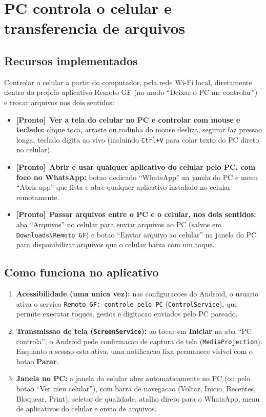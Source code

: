 \documentclass[11pt,a4paper]{article}
\newcommand{\feito}{\textcolor{laranja}{\textbf{[Pronto]}}\ }
\begin{document}
\section{PC controla o celular e transferencia de arquivos}
\label{sec:futuro}

\subsection{Recursos implementados}
Controlar o celular a partir do computador, pela rede Wi-Fi local, diretamente dentro do
proprio aplicativo Remoto GF (no modo ``Deixar o PC me controlar'') e trocar arquivos nos
dois sentidos:

\begin{itemize}
  \item \feito \textbf{Ver a tela do celular no PC e controlar com mouse e teclado:}
  clique toca, arraste ou rodinha do mouse desliza, segurar faz pressao longa, teclado
  digita ao vivo (incluindo \texttt{Ctrl+V} para colar texto do PC direto no celular).
  \item \feito \textbf{Abrir e usar qualquer aplicativo do celular pelo PC, com foco no WhatsApp:}
  botao dedicado ``WhatsApp'' na janela do PC e menu ``Abrir app'' que lista e abre
  qualquer aplicativo instalado no celular remotamente.
  \item \feito \textbf{Passar arquivos entre o PC e o celular, nos dois sentidos:}
  aba ``Arquivos'' no celular para enviar arquivos ao PC (salvos em \texttt{Downloads\textbackslash Remoto GF})
  e botao ``Enviar arquivo ao celular'' na janela do PC para disponibilizar arquivos que
  o celular baixa com um toque.
\end{itemize}

\subsection{Como funciona no aplicativo}
\begin{enumerate}
  \item \textbf{Acessibilidade (uma unica vez):} nas configuracoes do Android, o usuario ativa
  o servico \texttt{Remoto GF: controle pelo PC} (\texttt{ControlService}), que permite executar
  toques, gestos e digitacao enviados pelo PC pareado.
  \item \textbf{Transmissao de tela (\texttt{ScreenService}):} ao tocar em \textbf{Iniciar} na aba
  ``PC controla'', o Android pede confirmacao de captura de tela (\texttt{MediaProjection}).
  Enquanto a sessao esta ativa, uma notificacao fixa permanece visivel com o botao \textbf{Parar}.
  \item \textbf{Janela no PC:} a janela do celular abre automaticamente no PC (ou pelo botao
  ``Ver meu celular''), com barra de navegacao (Voltar, Inicio, Recentes, Bloquear, Print),
  seletor de qualidade, atalho direto para o WhatsApp, menu de aplicativos do celular e envio
  de arquivos.
\end{enumerate}
\end{document}
